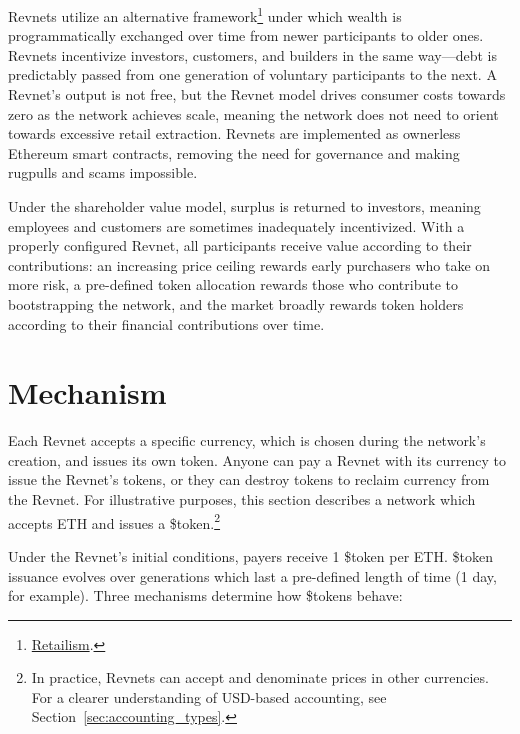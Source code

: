 \documentclass{article}
\begin{document}
Revnets utilize an alternative framework\footnote{\href{https://jango.eth.limo/9E01E72C-6028-48B7-AD04-F25393307132}{Retailism}.} under which wealth is programmatically exchanged over time from newer participants to older ones. Revnets incentivize investors, customers, and builders in the same way---debt is predictably passed from one generation of voluntary participants to the next. A Revnet's output is not free, but the Revnet model drives consumer costs towards zero as the network achieves scale, meaning the network does not need to orient towards excessive retail extraction. Revnets are implemented as ownerless Ethereum smart contracts, removing the need for governance and making rugpulls and scams impossible.

Under the shareholder value model, surplus is returned to investors, meaning employees and customers are sometimes inadequately incentivized. With a properly configured Revnet, all participants receive value according to their contributions: an increasing price ceiling rewards early purchasers who take on more risk, a pre-defined token allocation rewards those who contribute to bootstrapping the network, and the market broadly rewards token holders according to their financial contributions over time.

\section{Mechanism}

Each Revnet accepts a specific currency, which is chosen during the network's creation, and issues its own token. Anyone can pay a Revnet with its currency to issue the Revnet's tokens, or they can destroy tokens to reclaim currency from the Revnet. For illustrative purposes, this section describes a network which accepts ETH and issues a \$token.\footnote{In practice, Revnets can accept and denominate prices in other currencies. For a clearer understanding of USD-based accounting, see Section~\ref{sec:accounting_types}.}

Under the Revnet's initial conditions, payers receive 1 \$token per ETH. \$token issuance evolves over generations which last a pre-defined length of time (1 day, for example). Three mechanisms determine how \$tokens behave:
\end{document}
